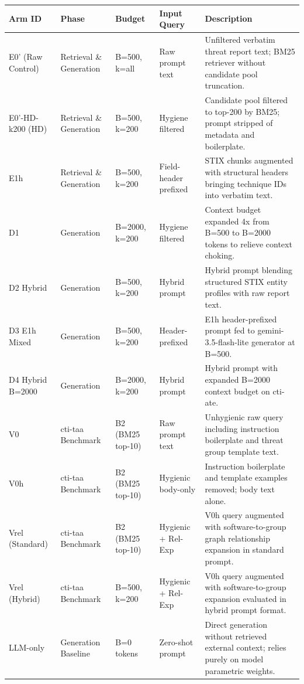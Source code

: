 \begin{tabular}{lllll}
\toprule
Arm ID & Phase & Budget & Input Query & Description \\
\midrule
E0' (Raw Control) & Retrieval \& Generation & B=500, k=all & Raw prompt text & Unfiltered verbatim threat report text; BM25 retriever without candidate pool truncation. \\
E0'-HD-k200 (HD) & Retrieval \& Generation & B=500, k=200 & Hygiene filtered & Candidate pool filtered to top-200 by BM25; prompt stripped of metadata and boilerplate. \\
E1h & Retrieval \& Generation & B=500, k=200 & Field-header prefixed & STIX chunks augmented with structural headers bringing technique IDs into verbatim text. \\
D1 & Generation & B=2000, k=200 & Hygiene filtered & Context budget expanded 4x from B=500 to B=2000 tokens to relieve context choking. \\
D2 Hybrid & Generation & B=500, k=200 & Hybrid prompt & Hybrid prompt blending structured STIX entity profiles with raw report text. \\
D3 E1h Mixed & Generation & B=500, k=200 & Header-prefixed & E1h header-prefixed prompt fed to gemini-3.5-flash-lite generator at B=500. \\
D4 Hybrid B=2000 & Generation & B=2000, k=200 & Hybrid prompt & Hybrid prompt with expanded B=2000 context budget on cti-ate. \\
V0 & cti-taa Benchmark & B2 (BM25 top-10) & Raw prompt text & Unhygienic raw query including instruction boilerplate and threat group template text. \\
V0h & cti-taa Benchmark & B2 (BM25 top-10) & Hygienic body-only & Instruction boilerplate and template examples removed; body text alone. \\
Vrel (Standard) & cti-taa Benchmark & B2 (BM25 top-10) & Hygienic + Rel-Exp & V0h query augmented with software-to-group graph relationship expansion in standard prompt. \\
Vrel (Hybrid) & cti-taa Benchmark & B=500, k=200 & Hygienic + Rel-Exp & V0h query augmented with software-to-group expansion evaluated in hybrid prompt format. \\
LLM-only & Generation Baseline & B=0 tokens & Zero-shot prompt & Direct generation without retrieved external context; relies purely on model parametric weights. \\
\bottomrule
\end{tabular}
